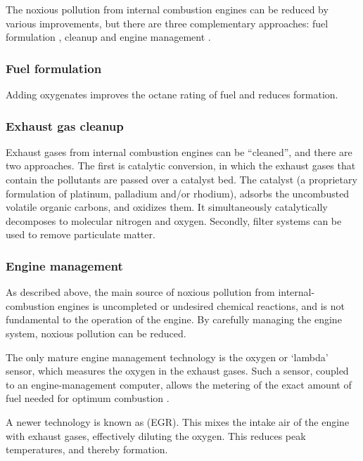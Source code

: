 The noxious pollution from internal combustion engines can be reduced by various
improvements, but there are three complementary approaches: fuel formulation
\autocite{Gertler1999}, cleanup \autocite{Braun2018} and engine management
\autocite{Reif2015}.

\subsubsection{Fuel formulation}

Adding oxygenates improves the octane rating of fuel and reduces \nox formation. 

\subsubsection{Exhaust gas cleanup} \label{par:cleanup}

Exhaust gases from internal combustion engines can be ``cleaned'', and there are
two approaches. The first is catalytic conversion, in which the exhaust gases
that contain the pollutants are passed over a catalyst bed. The catalyst (a
proprietary formulation of platinum, palladium and/or rhodium), adsorbs the
uncombusted volatile organic carbons, and oxidizes them. It simultaneously
catalytically decomposes \nox to molecular nitrogen and oxygen. Secondly, filter
systems can be used to remove particulate matter.

\subsubsection{Engine management} \label{par:engine-management}

As described above, the main source of noxious pollution from
internal\hyp{}combustion engines is uncompleted or undesired chemical reactions,
and is not fundamental to the operation of the engine. By carefully managing the
engine system, noxious pollution can be reduced. 

The only mature engine management technology is the oxygen or `lambda' sensor,
which measures the oxygen in the exhaust gases. Such a sensor, coupled to an
engine-management computer, allows the me\-ter\-ing of the exact amount of fuel
need\-ed for op\-ti\-mum combustion \autocite{Frauhammer2014}.

A newer technology is known as  (EGR). This
mixes the intake air of the engine with exhaust gases, effectively diluting the
oxygen. This reduces peak temperatures, and thereby \nox formation.

